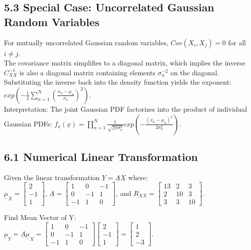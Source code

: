 \documentclass[12pt]{article}
\begin{document}
\subsection*{5.3 Special Case: Uncorrelated Gaussian Random Variables}
For mutually uncorrelated Gaussian random variables, $Cov(X_{i},X_{j})=0$ for all $i \ne j$. \\
The covariance matrix simplifies to a diagonal matrix, which implies the inverse $C_{XX}^{-1}$ is also a diagonal matrix containing elements $\sigma_{n}^{-2}$ on the diagonal. \\
Substituting the inverse back into the density function yields the exponent: $exp(-\frac{1}{2}\sum_{n=1}^{N}(\frac{x_{n}-\mu_{n}}{\sigma_{n}})^{2})$. \\
Interpretation: The joint Gaussian PDF factorizes into the product of individual Gaussian PDFs: $f_{\underline{x}}(\underline{x})=\prod_{n=1}^{N}\frac{1}{\sqrt{2\pi\sigma_{n}^{2}}}exp(-\frac{(x_{n}-\mu_{n})^{2}}{2\sigma_{n}^{2}})$.

\subsection*{6.1 Numerical Linear Transformation}
Given the linear transformation $\underline{Y}=\underline{A}\underline{X}$ where: \\
$\underline{\mu}_{X} = \begin{bmatrix} 2 \\ -1 \\ 1 \end{bmatrix}$, $\underline{A} = \begin{bmatrix} 1 & 0 & -1 \\ 0 & -1 & 1 \\ -1 & 1 & 0 \end{bmatrix}$, and $R_{XX} = \begin{bmatrix} 13 & 2 & 3 \\ 2 & 10 & 3 \\ 3 & 3 & 10 \end{bmatrix}$.

\noindent
Find Mean Vector of Y: \\
$\underline{\mu}_{Y} = \underline{A}\underline{\mu}_{X} = \begin{bmatrix} 1 & 0 & -1 \\ 0 & -1 & 1 \\ -1 & 1 & 0 \end{bmatrix} \begin{bmatrix} 2 \\ -1 \\ 1 \end{bmatrix} = \begin{bmatrix} 1 \\ 2 \\ -3 \end{bmatrix}$.
\end{document}
